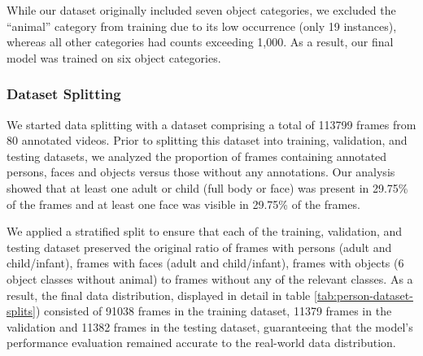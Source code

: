 \documentclass[
  man,floatsintext]{apa6}
\begin{document}
While our dataset originally included seven object categories, we excluded the ``animal'' category from training due to its low occurrence (only 19 instances), whereas all other categories had counts exceeding 1,000. As a result, our final model was trained on six object categories.

\subsubsection{Dataset Splitting}\label{dataset-splitting}

We started data splitting with a dataset comprising a total of 113799 frames from 80 annotated videos. Prior to splitting this dataset into training, validation, and testing datasets, we analyzed the proportion of frames containing annotated persons, faces and objects versus those without any annotations. Our analysis showed that at least one adult or child (full body or face) was present in 29.75\% of the frames and at least one face was visible in 29.75\% of the frames.

We applied a stratified split to ensure that each of the training, validation, and testing dataset preserved the original ratio of frames with persons (adult and child/infant), frames with faces (adult and child/infant), frames with objects (6 object classes without animal) to frames without any of the relevant classes. As a result, the final data distribution, displayed in detail in table \ref{tab:person-dataset-splits}) consisted of 91038 frames in the training dataset, 11379 frames in the validation and 11382 frames in the testing dataset, guaranteeing that the model's performance evaluation remained accurate to the real-world data distribution.
\end{document}

